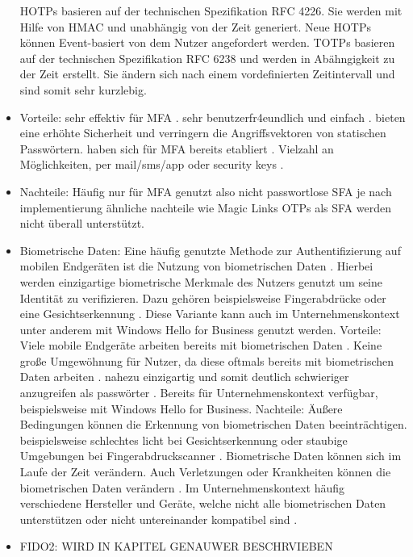 \begin{itemize}
    \ac{HOTP}s basieren auf der technischen Spezifikation RFC 4226. Sie werden mit Hilfe von \ac{HMAC} und unabhängig von der Zeit generiert. Neue \ac{HOTP}s können Event-basiert von dem Nutzer angefordert werden. \cite{chowhan2019password}
    \ac{TOTP}s basieren auf der technischen Spezifikation RFC 6238 und werden in Abähngigkeit zu der Zeit erstellt. Sie ändern sich nach einem vordefinierten Zeitintervall und sind somit sehr kurzlebig. \cite{chowhan2019password}
    \item Vorteile:
    sehr effektiv für \ac{MFA} \cite{parmar2022comprehensive}.
    sehr benutzerfr4eundlich und einfach \cite{parmar2022comprehensive}.
    bieten eine erhöhte Sicherheit und verringern die Angriffsvektoren von statischen Passwörtern. \cite{chowhan2019password}
    haben sich für \ac{MFA} bereits etabliert \cite{parmar2022comprehensive}.
    Vielzahl an Möglichkeiten, per mail/sms/app oder security keys \cite{chowhan2019password} \cite{parmar2022comprehensive}.
    \item Nachteile:
    Häufig nur für \ac{MFA} genutzt also nicht passwortlose \ac{SFA} 
    je nach implementierung ähnliche nachteile wie Magic Links
    \ac{OTP}s als \ac{SFA} werden nicht überall unterstützt.
    
    \item Biometrische Daten:
    Eine häufig genutzte Methode zur Authentifizierung auf mobilen Endgeräten ist die Nutzung von biometrischen Daten \cite{parmar2022comprehensive}. 
    Hierbei werden einzigartige biometrische Merkmale des Nutzers genutzt um seine Identität zu verifizieren. Dazu gehören beispielsweise Fingerabdrücke oder eine Gesichtserkennung \cite{parmar2022comprehensive}. Diese Variante kann auch im Unternehmenskontext unter anderem mit Windows Hello for Business genutzt werden.
    Vorteile:
    Viele mobile Endgeräte arbeiten bereits mit biometrischen Daten \cite{parmar2022comprehensive}.
    Keine große Umgewöhnung für Nutzer, da diese oftmals bereits mit biometrischen Daten arbeiten \cite{parmar2022comprehensive}.
    nahezu einzigartig und somit deutlich schwieriger anzugreifen als passwörter \cite{parmar2022comprehensive}.
    Bereits für Unternehmenskontext verfügbar, beispielsweise mit Windows Hello for Business.
    Nachteile:
    Äußere Bedingungen können die Erkennung von biometrischen Daten beeinträchtigen. beispielsweise schlechtes licht bei Gesichtserkennung oder staubige Umgebungen bei Fingerabdruckscanner \cite{parmar2022comprehensive}.
    Biometrische Daten können sich im Laufe der Zeit verändern. Auch Verletzungen oder Krankheiten können die biometrischen Daten verändern \cite{boonkrong2012security}.
    Im Unternehmenskontext häufig verschiedene Hersteller und Geräte, welche nicht alle biometrischen Daten unterstützen oder nicht untereinander kompatibel sind \cite{parmar2022comprehensive}.

    \item FIDO2:
    WIRD IN KAPITEL GENAUWER BESCHRVIEBEN


\end{itemize}

